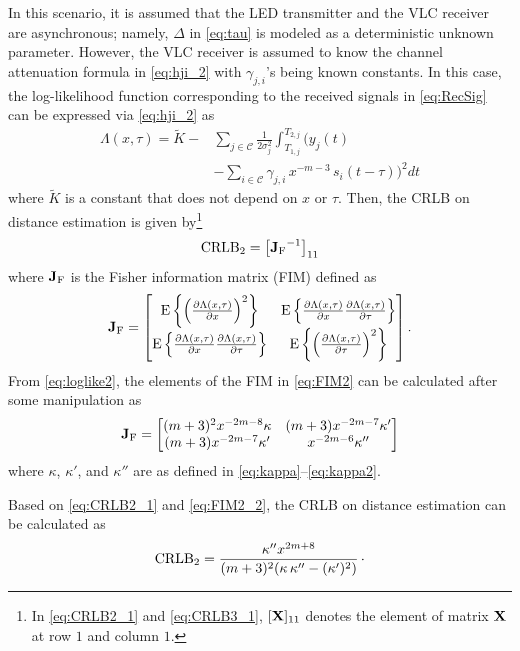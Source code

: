 \documentclass[10pt,twocolumn]{IEEEtran}
\newcommand{\CRLB}{{\rm{CRLB}}}
\newcommand{\rmE}{{\rm{E}}}
\newcommand{\JF}{{\rm{\bf{J}}_{\rm{F}}}}
\newcommand{\mtC}{{\mathcal{C}}}
\begin{document}
In this scenario, it is assumed that the LED transmitter and the VLC receiver are asynchronous; namely, $\Delta$ in \eqref{eq:tau} is modeled as a deterministic unknown parameter. However, the VLC receiver is assumed to know the channel attenuation formula in \eqref{eq:hji_2} with $\gamma_{j,i}$'s being known constants. In this case, the log-likelihood function corresponding to the received signals in \eqref{eq:RecSig} can be expressed via \eqref{eq:hji_2} as
\begin{align}\label{eq:loglike2}
\Lambda(x,\tau) = \tilde{K} - &\sum_{j\in\mtC} \frac{1}{2\sigma_j^2}\int_{T_{1,j}}^{T_{2,j}}
\bigg(y_j(t)
\\\nonumber
&-\sum_{i\in\mtC}\gamma_{j,i}\,x^{-m-3}\,s_i(t-\tau)\bigg)^2dt
\end{align}
where $\tilde{K}$ is a constant that does not depend on $x$ or $\tau$. Then, the CRLB on distance estimation is given by\footnote{In \eqref{eq:CRLB2_1} and \eqref{eq:CRLB3_1}, $[{\bf{X}}]_{11}$ denotes the element of matrix ${\bf{X}}$ at row $1$ and column $1$.}
\begin{gather}\label{eq:CRLB2_1}
\CRLB_2=\left[\JF^{-1}\right]_{11}
\end{gather}
where $\JF$ is the Fisher information matrix (FIM) defined as
\begin{gather}\label{eq:FIM2}
\JF=\begin{bmatrix}
\rmE\left\{\left(\frac{\partial\Lambda(x,\tau)}{\partial x}\right)^2\right\}&\rmE\left\{\frac{\partial\Lambda(x,\tau)}{\partial x}\frac{\partial\Lambda(x,\tau)}{\partial\tau}\right\}\\
\rmE\left\{\frac{\partial\Lambda(x,\tau)}{\partial x}\frac{\partial\Lambda(x,\tau)}{\partial\tau}\right\}&\rmE\left\{\left(\frac{\partial\Lambda(x,\tau)}{\partial\tau}\right)^2\right\}
\end{bmatrix}.
\end{gather}
From \eqref{eq:loglike2}, the elements of the FIM in \eqref{eq:FIM2} can be calculated after some manipulation as
\begin{gather}\label{eq:FIM2_2}
\JF=\begin{bmatrix}
(m+3)^2x^{-2m-8}\kappa & (m+3)x^{-2m-7}\kappa'
\\(m+3)x^{-2m-7}\kappa' & x^{-2m-6}\kappa''
\end{bmatrix}
\end{gather}
where $\kappa$, $\kappa'$, and $\kappa''$ are as defined in \eqref{eq:kappa}--\eqref{eq:kappa2}.

Based on \eqref{eq:CRLB2_1} and \eqref{eq:FIM2_2}, the CRLB on distance estimation can be calculated as
\begin{gather}\label{eq:CRLB2_2}
\CRLB_2=\frac{\kappa''x^{2m+8}}{(m+3)^2(\kappa\,\kappa''-(\kappa')^2)}\,\cdot
\end{gather}
\end{document}
